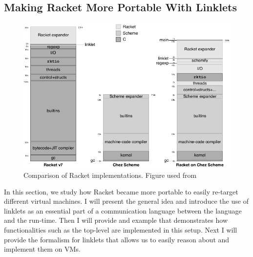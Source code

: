 
\subsection{Making Racket More Portable With Linklets}
\label{subsec:racket}
\vspace{-0.3cm}
\begin{figure}[h!]
  \centering
  \includegraphics[scale=0.3]{img/racket-portable}
  \caption{Comparison of Racket implementations. Figure used
  from \cite{racket-on-chez-19}}
  \label{fig:racket-portable}
\end{figure}
\vspace{-0.3cm}
In this section, we study how Racket became more portable to easily
re-target different virtual machines. I will present the general idea
and introduce the use of linklets as an essential part of a
communication language between the language and the run-time. Then I
will provide and example that demonstrates how functionalities such as
the top-level are implemented in this setup. Next I will provide the
formalism for linklets that allows us to easily reason about and
implement them on VMs.

\vspace{-0.25cm}


